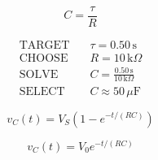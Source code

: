 \documentclass{article}
\begin{document}
\begin{preview}\[C=\frac{\tau}{R}\]\end{preview}
\begin{preview}\[\begin{aligned}\text{TARGET}&\quad \tau=0.50\,\mathrm{s}\\\text{CHOOSE}&\quad R=10\,\mathrm{k}\Omega\\\text{SOLVE}&\quad C=\frac{0.50\,\mathrm{s}}{10\,\mathrm{k}\Omega}\\\text{SELECT}&\quad C\approx50\,\mu\mathrm{F}\end{aligned}\]\end{preview}
\begin{preview}\[v_C(t)=V_S\left(1-e^{-t/(RC)}\right)\]\end{preview}
\begin{preview}\[v_C(t)=V_0e^{-t/(RC)}\]\end{preview}
\end{document}
